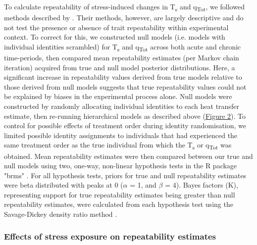 \documentclass[12pt]{article}
\begin{document}
\noindent To calculate repeatability of stress-induced changes in T\textsubscript{s} and q\textsubscript{Tot}, we followed methods described by \citet{araya_2015}. Their methods, however, are largely descriptive and do not test the presence or absence of trait repeatability within experimental context. To correct for this, we constructed null models (i.e. models with individual identities scrambled) for T\textsubscript{s} and q\textsubscript{Tot} across both acute and chronic time-periods, then compared mean repeatability estimates (per Markov chain iteration) acquired from true and null model posterior distributions. Here, a significant increase in repeatability values derived from true models relative to those derived from null models suggests that true repeatability values could not be explained by biases in the experimental process alone. Null models were constructed by randomly allocating individual identities to each heat transfer estimate, then re-running hierarchical models as described above (\hyperref[Fig4.2]{Figure 2}). To control for possible effects of treatment order during identity randomisation, we limited possible identity assignments to individuals that had experienced the same treatment order as the true individual from which the T\textsubscript{s} or q\textsubscript{Tot} was obtained. Mean repeatability estimates were then compared between our true and null models using two, one-way, non-linear hypothesis tests in the R package "brms" \citep{burkner_2017}. For all hypothesis tests, priors for true and null repeatability estimates were beta distributed with peaks at 0 ($\alpha$ = 1, and $\beta$ = 4). Bayes factors (K), representing support for true repeatability estimates being greater than null repeatability estimates, were calculated from each hypothesis test using the Savage-Dickey density ratio method \citep{wagenmakers_2010}.\vspace{0.5cm}  

\subsubsection{Effects of stress exposure on repeatability estimates}
\vspace{0.5cm}
\end{document}
